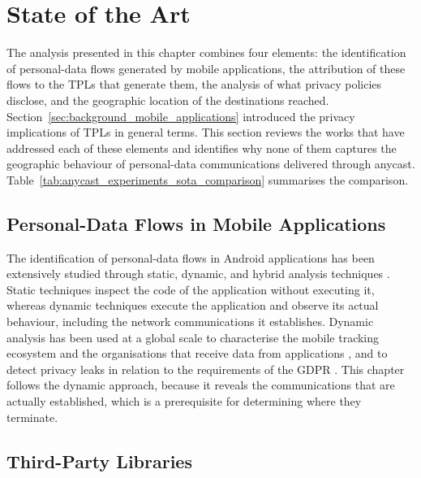 \documentclass[
A4paper,                %
twoside,                %
openright,              %
chapterprefix=true,     %
12pt,                   %
headings=normal,        %
titlepage=on            %
]{book}
\begin{document}
\section{State of the Art}
\label{sc:anycast_experiments_sota}

The analysis presented in this chapter combines four elements: the identification of personal-data flows generated by mobile applications, the attribution of these flows to the TPLs that generate them, the analysis of what privacy policies disclose, and the geographic location of the destinations reached. Section~\ref{sec:background_mobile_applications} introduced the privacy implications of TPLs in general terms. This section reviews the works that have addressed each of these elements and identifies why none of them captures the geographic behaviour of personal-data communications delivered through anycast. Table~\ref{tab:anycast_experiments_sota_comparison} summarises the comparison.

\subsection{Personal-Data Flows in Mobile Applications}
\label{sc:anycast_experiments_sota_flows}

The identification of personal-data flows in Android applications has been extensively studied through static, dynamic, and hybrid analysis techniques \cite{DelAlamo2021PrivacyStudy}. Static techniques inspect the code of the application without executing it, whereas dynamic techniques execute the application and observe its actual behaviour, including the network communications it establishes. Dynamic analysis has been used at a global scale to characterise the mobile tracking ecosystem and the organisations that receive data from applications \cite{Razaghpanah2018AppsEcosystem}, and to detect privacy leaks in relation to the requirements of the GDPR \cite{Jia2019WhoCompliance}. This chapter follows the dynamic approach, because it reveals the communications that are actually established, which is a prerequisite for determining where they terminate.

\subsection{Third-Party Libraries}
\label{sc:anycast_experiments_sota_tpls}
\end{document}

